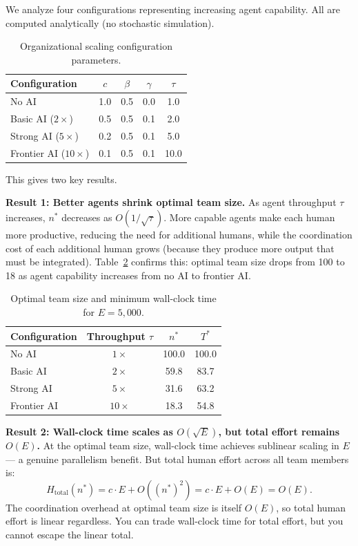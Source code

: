 \documentclass[11pt,a4paper]{article}
\begin{document}
We analyze four configurations representing increasing agent capability. All are computed analytically (no stochastic simulation).

\begin{table}[h]
\centering
\caption{Organizational scaling configuration parameters.}
\begin{tabular}{lcccc}
\toprule
Configuration & $c$ & $\beta$ & $\gamma$ & $\tau$ \\
\midrule
No AI & 1.0 & 0.5 & 0.0 & 1.0 \\
Basic AI ($2\times$) & 0.5 & 0.5 & 0.1 & 2.0 \\
Strong AI ($5\times$) & 0.2 & 0.5 & 0.1 & 5.0 \\
Frontier AI ($10\times$) & 0.1 & 0.5 & 0.1 & 10.0 \\
\bottomrule
\end{tabular}
\label{tab:org_configs}
\end{table}

This gives two key results.

\textbf{Result 1: Better agents shrink optimal team size.} As agent throughput $\tau$ increases, $n^*$ decreases as $O(1/\sqrt{\tau})$. More capable agents make each human more productive, reducing the need for additional humans, while the coordination cost of each additional human grows (because they produce more output that must be integrated). Table~\ref{tab:org} confirms this: optimal team size drops from 100 to 18 as agent capability increases from no AI to frontier AI.

\begin{table}[ht]
\centering
\caption{Optimal team size and minimum wall-clock time for $E = 5{,}000$.}
\begin{tabular}{lccc}
\toprule
Configuration & Throughput $\tau$ & $n^*$ & $T^*$ \\
\midrule
No AI & $1\times$ & 100.0 & 100.0 \\
Basic AI & $2\times$ & 59.8 & 83.7 \\
Strong AI & $5\times$ & 31.6 & 63.2 \\
Frontier AI & $10\times$ & 18.3 & 54.8 \\
\bottomrule
\end{tabular}
\label{tab:org}
\end{table}

\textbf{Result 2: Wall-clock time scales as $O(\sqrt{E})$, but total effort remains $O(E)$.} At the optimal team size, wall-clock time achieves sublinear scaling in $E$ --- a genuine parallelism benefit. But total human effort across all team members is:
\begin{equation}
H_{\text{total}}(n^*) = c \cdot E + O((n^*)^2) = c \cdot E + O(E) = O(E).
\end{equation}
The coordination overhead at optimal team size is itself $O(E)$, so total human effort is linear regardless. You can trade wall-clock time for total effort, but you cannot escape the linear total.
\end{document}
